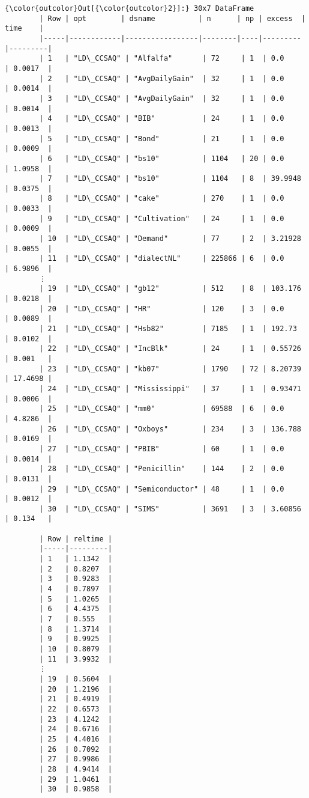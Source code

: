\documentclass{article}
\begin{document}
            \begin{Verbatim}[commandchars=\\\{\}]
{\color{outcolor}Out[{\color{outcolor}2}]:} 30x7 DataFrame
        | Row | opt        | dsname          | n      | np | excess  | time    |
        |-----|------------|-----------------|--------|----|---------|---------|
        | 1   | "LD\_CCSAQ" | "Alfalfa"       | 72     | 1  | 0.0     | 0.0017  |
        | 2   | "LD\_CCSAQ" | "AvgDailyGain"  | 32     | 1  | 0.0     | 0.0014  |
        | 3   | "LD\_CCSAQ" | "AvgDailyGain"  | 32     | 1  | 0.0     | 0.0014  |
        | 4   | "LD\_CCSAQ" | "BIB"           | 24     | 1  | 0.0     | 0.0013  |
        | 5   | "LD\_CCSAQ" | "Bond"          | 21     | 1  | 0.0     | 0.0009  |
        | 6   | "LD\_CCSAQ" | "bs10"          | 1104   | 20 | 0.0     | 1.0958  |
        | 7   | "LD\_CCSAQ" | "bs10"          | 1104   | 8  | 39.9948 | 0.0375  |
        | 8   | "LD\_CCSAQ" | "cake"          | 270    | 1  | 0.0     | 0.0033  |
        | 9   | "LD\_CCSAQ" | "Cultivation"   | 24     | 1  | 0.0     | 0.0009  |
        | 10  | "LD\_CCSAQ" | "Demand"        | 77     | 2  | 3.21928 | 0.0055  |
        | 11  | "LD\_CCSAQ" | "dialectNL"     | 225866 | 6  | 0.0     | 6.9896  |
        ⋮
        | 19  | "LD\_CCSAQ" | "gb12"          | 512    | 8  | 103.176 | 0.0218  |
        | 20  | "LD\_CCSAQ" | "HR"            | 120    | 3  | 0.0     | 0.0089  |
        | 21  | "LD\_CCSAQ" | "Hsb82"         | 7185   | 1  | 192.73  | 0.0102  |
        | 22  | "LD\_CCSAQ" | "IncBlk"        | 24     | 1  | 0.55726 | 0.001   |
        | 23  | "LD\_CCSAQ" | "kb07"          | 1790   | 72 | 8.20739 | 17.4698 |
        | 24  | "LD\_CCSAQ" | "Mississippi"   | 37     | 1  | 0.93471 | 0.0006  |
        | 25  | "LD\_CCSAQ" | "mm0"           | 69588  | 6  | 0.0     | 4.8286  |
        | 26  | "LD\_CCSAQ" | "Oxboys"        | 234    | 3  | 136.788 | 0.0169  |
        | 27  | "LD\_CCSAQ" | "PBIB"          | 60     | 1  | 0.0     | 0.0014  |
        | 28  | "LD\_CCSAQ" | "Penicillin"    | 144    | 2  | 0.0     | 0.0131  |
        | 29  | "LD\_CCSAQ" | "Semiconductor" | 48     | 1  | 0.0     | 0.0012  |
        | 30  | "LD\_CCSAQ" | "SIMS"          | 3691   | 3  | 3.60856 | 0.134   |
        
        | Row | reltime |
        |-----|---------|
        | 1   | 1.1342  |
        | 2   | 0.8207  |
        | 3   | 0.9283  |
        | 4   | 0.7897  |
        | 5   | 1.0265  |
        | 6   | 4.4375  |
        | 7   | 0.555   |
        | 8   | 1.3714  |
        | 9   | 0.9925  |
        | 10  | 0.8079  |
        | 11  | 3.9932  |
        ⋮
        | 19  | 0.5604  |
        | 20  | 1.2196  |
        | 21  | 0.4919  |
        | 22  | 0.6573  |
        | 23  | 4.1242  |
        | 24  | 0.6716  |
        | 25  | 4.4016  |
        | 26  | 0.7092  |
        | 27  | 0.9986  |
        | 28  | 4.9414  |
        | 29  | 1.0461  |
        | 30  | 0.9858  |
\end{Verbatim}
        
\end{document}
